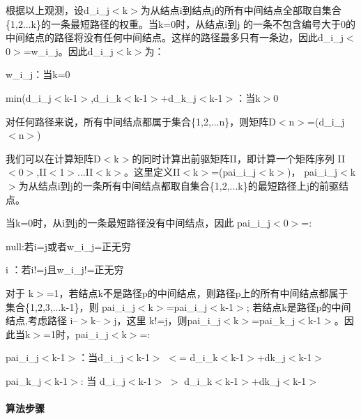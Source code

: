 根据以上观测，设d\+\_\+i\+\_\+j$<$k$>$为从结点i到结点j的所有中间结点全部取自集合\{1,2...k\}的一条最短路径的权重。当k=0时，从结点i到j 的一条不包含编号大于0的中间结点的路径将没有任何中间结点。这样的路径最多只有一条边，因此d\+\_\+i\+\_\+j$<$0$>$=w\+\_\+i\+\_\+j。因此d\+\_\+i\+\_\+j$<$k$>$为：


\begin{DoxyItemize}
\item w\+\_\+i\+\_\+j：当k=0
\item min(d\+\_\+i\+\_\+j$<$k-\/1$>$,d\+\_\+i\+\_\+k$<$k-\/1$>$+d\+\_\+k\+\_\+j$<$k-\/1$>$：当k$>$0
\end{DoxyItemize}

对任何路径来说，所有中间结点都属于集合\{1,2,...n\}，则矩阵\+D$<$n$>$=(d\+\_\+i\+\_\+j$<$n$>$)

我们可以在计算矩阵\+D$<$k$>$的同时计算出前驱矩阵\+I\+I，即计算一个矩阵序列 I\+I$<$0$>$,I\+I$<$1$>$...I\+I$<$k$>$。这里定义\+I\+I$<$k$>$=(pai\+\_\+i\+\_\+j$<$k$>$)， pai\+\_\+i\+\_\+j$<$k$>$为从结点i到j的一条所有中间结点都取自集合\{1,2,...k\}的最短路径上j的前驱结点。

当k=0时，从i到j的一条最短路径没有中间结点，因此 pai\+\_\+i\+\_\+j$<$0$>$=\+:


\begin{DoxyItemize}
\item null\+:若i=j或者w\+\_\+i\+\_\+j=正无穷
\item i ：若i!=j且w\+\_\+i\+\_\+j!=正无穷
\end{DoxyItemize}

对于 k$>$=1，若结点k不是路径p的中间结点，则路径p上的所有中间结点都属于集合\{1,2,3,...k-\/1\}，则 pai\+\_\+i\+\_\+j$<$k$>$=pai\+\_\+i\+\_\+j$<$k-\/1$>$; 若结点k是路径p的中间结点,考虑路径 i--$>$k--$>$j，这里 k!=j，则pai\+\_\+i\+\_\+j$<$k$>$=pai\+\_\+k\+\_\+j$<$k-\/1$>$。因此当k$>$=1时，pai\+\_\+i\+\_\+j$<$k$>$=\+:


\begin{DoxyItemize}
\item pai\+\_\+i\+\_\+j$<$k-\/1$>$：当d\+\_\+i\+\_\+j$<$k-\/1$>$ $<$= d\+\_\+i\+\_\+k$<$k-\/1$>$+dk\+\_\+j$<$k-\/1$>$
\item pai\+\_\+k\+\_\+j$<$k-\/1$>$\+: 当 d\+\_\+i\+\_\+j$<$k-\/1$>$ $>$ d\+\_\+i\+\_\+k$<$k-\/1$>$+dk\+\_\+j$<$k-\/1$>$
\end{DoxyItemize}

\paragraph*{算法步骤}


